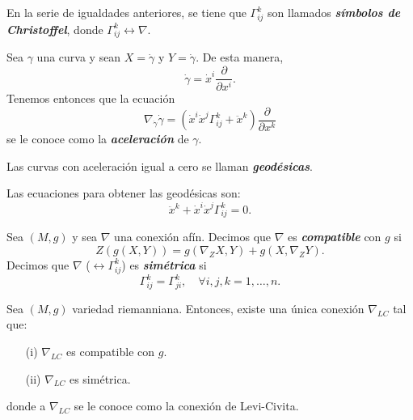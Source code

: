 En la serie de igualdades anteriores, se tiene que $\Gamma_{ij}^k$ son llamados \textit{\textbf{s\'imbolos de Christoffel}}, donde $\Gamma_{ij}^k\leftrightarrow\nabla$.

\begin{example}
Sea $\gamma$ una curva y sean $X=\dot{\gamma}$ y $Y=\dot{\gamma}$. De esta manera, 
\begin{equation*}
    \dot{\gamma}=\dot{x}^i\frac{\partial}{\partial x^i}.
\end{equation*}
Tenemos entonces que la ecuaci\'on
\begin{equation*}
    \nabla_{\dot{\gamma}}\dot{\gamma}=\left(\dot{x}^i\dot{x}^j\Gamma_{ij}^k+\ddot{x}^k\right)\frac{\partial}{\partial x^k}
\end{equation*}
se le conoce como la \textbf{\textit{aceleraci\'on}} de $\gamma$.
\end{example}

\begin{definition}
Las curvas con aceleraci\'on igual a cero se llaman \textit{\textbf{geod\'esicas}}.   
\end{definition}

\begin{observation}
Las ecuaciones para obtener las geod\'esicas son:
\begin{equation*}
    \ddot{x}^k+\dot{x}^i\dot{x}^j\Gamma_{ij}^k=0.
\end{equation*}
\end{observation}

\begin{definition}
Sea $(M,g)$ y sea $\nabla$ una conexi\'on af\'in. Decimos que $\nabla$ es \textit{\textbf{compatible}} con $g$ si
\begin{equation*}
    Z(g(X,Y))=g(\nabla_ZX,Y)+g(X,\nabla_ZY).
\end{equation*}
Decimos que $\nabla$ ($\leftrightarrow\Gamma_{ij}^k$) es \textbf{\textit{sim\'etrica}} si 
\begin{equation*}
    \Gamma_{ij}^k=\Gamma_{ji}^k,\quad\forall i,j,k=1,\dots,n.
\end{equation*}
\end{definition}

\begin{theorem}
Sea $(M,g)$ variedad riemanniana. Entonces, existe una \'unica conexi\'on $\nabla_{LC}$ tal que:
\begin{enumerate}
    \item[(i)] $\nabla_{LC}$ es compatible con $g$.
    \item[(ii)] $\nabla_{LC}$ es sim\'etrica.
\end{enumerate}
donde a $\nabla_{LC}$ se le conoce como la conexi\'on de Levi-Civita.
\end{theorem}

